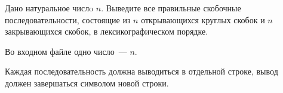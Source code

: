 Дано натуральное числo $n$. Выведите все правильные скобочные последовательности, состоящие из $n$ открывающихся круглых скобок
и $n$ закрывающихся скобок, в лексикографическом порядке.

\InputFile

Во входном файле одно число~--- $n$.

\OutputFile

Каждая последовательность должна выводиться в отдельной строке, вывод должен завершаться символом новой строки.
